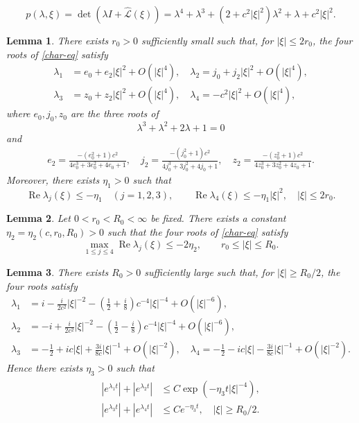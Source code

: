 \documentclass[10pt,a4paper]{amsart}
\newtheorem{lem}{Lemma}
\begin{document}
\begin{equation}\label{char-eq}
p(\lambda,\xi) =\det\left(\lambda I+\widehat{\mathcal{L}}(\xi)\right) =\lambda^4+\lambda^3+\left(2+c^2|\xi|^2\right)\lambda^2+\lambda+c^2|\xi|^2.
\end{equation}

\begin{lem}\label{lem-low}
There exists $r_0>0$ sufficiently small such that, for $|\xi|\le 2r_0$, the four roots of \eqref{char-eq} satisfy
\begin{align*}
\lambda_1&=e_0+e_2|\xi|^2+O(|\xi|^4),\quad \lambda_2=j_0+j_2|\xi|^2+O(|\xi|^4),\\
\lambda_3&=z_0+z_2|\xi|^2+O(|\xi|^4),\quad \lambda_4=-c^2|\xi|^2+O(|\xi|^4),
\end{align*}
where $e_0,j_0,z_0$ are the three roots of
\[
\lambda^3+\lambda^2+2\lambda+1=0
\]
and
\begin{align*}
e_2=\frac{-(e_0^2+1)c^2}{4e_0^3+3e_0^2+4e_0+1},\quad
j_2=\frac{-(j_0^2+1)c^2}{4j_0^3+3j_0^2+4j_0+1},\quad
z_2=\frac{-(z_0^2+1)c^2}{4z_0^3+3z_0^2+4z_0+1}.
\end{align*}
Moreover, there exists $\eta_1>0$ such that
\[
\operatorname{Re}\lambda_j(\xi)\le-\eta_1\quad (j=1,2,3),
\qquad
\operatorname{Re}\lambda_4(\xi)\le-\eta_1|\xi|^2,
\quad |\xi|\le2r_0.
\]
\end{lem}

\begin{lem}\label{lem-middle-gap}
	Let $0<r_0<R_0<\infty$ be fixed. There exists a constant
	$ \eta_2 = \eta_2 (c,r_0,R_0)>0$ such that the four roots of
	\eqref{char-eq} satisfy
	\begin{equation}\label{middle-spectral-gap}
		\max_{1\le j\le4}\operatorname{Re}\lambda_j(\xi)
		\le - 2\eta_2, 
		\qquad r_0\le |\xi|\le R_0.
	\end{equation}
\end{lem}

\begin{lem}\label{lem-high}
There exists $R_0>0$ sufficiently large such that, for $|\xi|\ge R_0/2$, the four roots satisfy
\begin{align*}
\lambda_1&=i-\frac{i}{2c^2}|\xi|^{-2}
-\left(\frac12+\frac{i}{8}\right)c^{-4}|\xi|^{-4}+O(|\xi|^{-6}),\\
\lambda_2&=-i+\frac{i}{2c^2}|\xi|^{-2}
-\left(\frac12-\frac{i}{8}\right)c^{-4}|\xi|^{-4}+O(|\xi|^{-6}),\\
\lambda_3&=-\frac12+ic|\xi|+\frac{3i}{8c}|\xi|^{-1}+O(|\xi|^{-2}),\quad \lambda_4 =-\frac12-ic|\xi|-\frac{3i}{8c}|\xi|^{-1}+O(|\xi|^{-2}).
\end{align*}
Hence there exists $\eta_3 >0$ such that
\begin{align}\label{high-eigen-decay}
\begin{aligned}
|e^{\lambda_1t}|+|e^{\lambda_2t}| &\le C\exp\left(-\eta_3  t|\xi|^{-4}\right),\\
|e^{\lambda_3t}|+|e^{\lambda_4t}| &\le Ce^{-\eta_3  t},
\quad |\xi|\ge R_0/2.
\end{aligned}
\end{align}
\end{lem}
\end{document}
